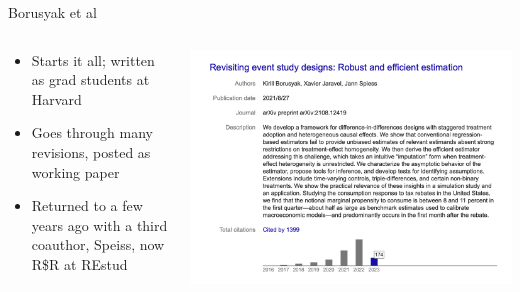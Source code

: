 \documentclass{beamer}
\begin{document}
\begin{frame}{Borusyak et al}
  \begin{columns}
    \begin{column}{0.5\textwidth}
      \begin{itemize}
\item Starts it all; written as grad students at Harvard
\item Goes through many revisions, posted as working paper
\item Returned to a few years ago with a third coauthor, Speiss, now R\$R at REstud
      \end{itemize}
    \end{column}
    \begin{column}{0.5\textwidth}
      \includegraphics[scale=0.25]{./lecture_includes/kirill_cites}
    \end{column}
  \end{columns}
\end{frame}
\end{document}
